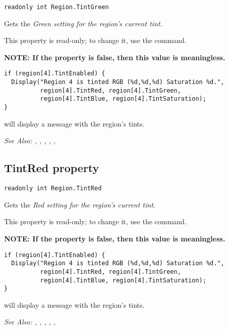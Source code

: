 \begin{verbatim}
readonly int Region.TintGreen
\end{verbatim}
Gets the \it{Green} setting for the region's current tint.

This property is read-only; to change it, use the  command.

\bf{NOTE:} If the  property is false, then
this value is meaningless.

\begin{verbatim}
if (region[4].TintEnabled) {
  Display("Region 4 is tinted RGB (%d,%d,%d) Saturation %d.",
          region[4].TintRed, region[4].TintGreen,
          region[4].TintBlue, region[4].TintSaturation);
}
\end{verbatim}
will display a message with the region's tints.

\it{See Also:} , ,
, ,
, 


\subsection{TintRed property}\label{Region.TintRed}%

\begin{verbatim}
readonly int Region.TintRed
\end{verbatim}
Gets the \it{Red} setting for the region's current tint.

This property is read-only; to change it, use the  command.

\bf{NOTE:} If the  property is false, then
this value is meaningless.

\begin{verbatim}
if (region[4].TintEnabled) {
  Display("Region 4 is tinted RGB (%d,%d,%d) Saturation %d.",
          region[4].TintRed, region[4].TintGreen,
          region[4].TintBlue, region[4].TintSaturation);
}
\end{verbatim}
will display a message with the region's tints.

\it{See Also:} , ,
, ,
, 


